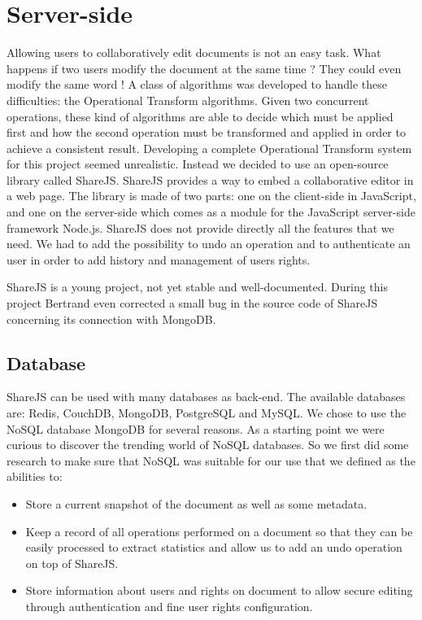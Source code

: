 \documentclass{llncs}
\begin{document}
\section{Server-side}\label{sec:Server-side}

Allowing users to collaboratively edit documents is not an easy task.
What happens if two users modify the document at the same time ?
They could even modify the same word ! A class of algorithms was developed to handle these difficulties:
the Operational Transform algorithms. Given two concurrent operations, these kind
of algorithms are able to decide which must be applied first and how the second
operation must be transformed and applied in order to achieve a consistent result.
Developing a complete Operational Transform system for this project seemed unrealistic.
Instead we decided to use an open-source library called ShareJS.\cite{sharejs}
ShareJS provides a way to embed a collaborative editor in a web page.
The library is made of two parts: one on the client-side in JavaScript, 
and one on the server-side which comes as a module for the JavaScript server-side framework
Node.js.
ShareJS does not provide directly all the features that we need. 
We had to add the possibility to undo an operation and to authenticate an user in order to add
history and management of users rights.

ShareJS is a young project, not yet stable and well-documented.
During this project Bertrand even corrected a small bug in the source code of ShareJS concerning its connection with MongoDB.

\subsection{Database}
ShareJS can be used with many databases as back-end. 
The available databases are: Redis, CouchDB, MongoDB, PostgreSQL and MySQL.
We chose to use the NoSQL database MongoDB\cite{mongo} for several reasons. As a starting
point we were curious to discover the trending world of NoSQL databases. So we
first did some research to make sure that NoSQL was suitable for our use that we
defined as the abilities to:

\begin{itemize}
        \item Store a current snapshot of the document as well as some metadata.
        \item Keep a record of all operations performed on a document so that
            they can be easily processed to extract statistics and allow us to
            add an undo operation on top of ShareJS.
        \item Store information about users and rights on document to allow
            secure editing through authentication and fine user rights
            configuration.
\end{itemize}
\end{document}
